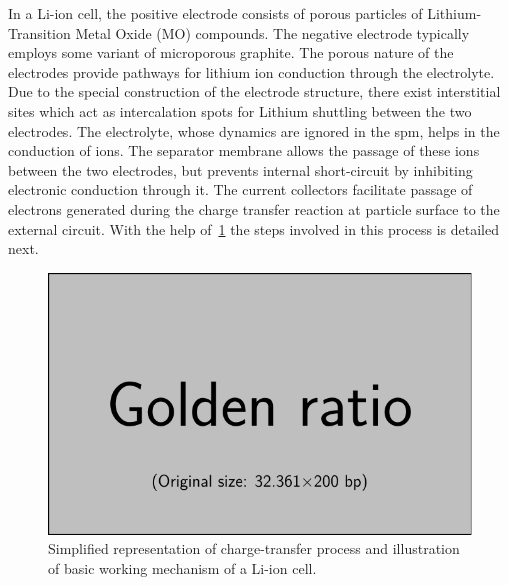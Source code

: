 In  a Li-ion  cell,  the  positive electrode  consists  of  porous particles  of
Lithium-Transition Metal Oxide (MO)  compounds. The negative electrode typically
employs  some  variant  of  microporous  graphite.  The  porous  nature  of  the
electrodes provide pathways for lithium  ion conduction through the electrolyte.
Due  to  the  special  construction  of the  electrode  structure,  there  exist
interstitial  sites  which act  as  intercalation  spots for  Lithium  shuttling
between the two  electrodes. The electrolyte, whose dynamics are  ignored in the
\gls{spm}, helps  in the  conduction of   ions. The  separator membrane
allows  the passage  of  these ions  between the  two  electrodes, but  prevents
internal  short-circuit  by inhibiting  electronic  conduction  through it.  The
current collectors facilitate  passage of electrons generated  during the charge
transfer reaction  at particle surface  to the  external circuit. With  the help
of~\cref{fig:chargetransferprocess}  the  steps  involved  in  this  process  is
detailed next.

\begin{figure}[h]
    \centering
    \includegraphics{placeholder_images/example-image-golden.pdf}
    \caption[Charge-transer and basic working mechanism of a Li-ion cell]{Simplified representation of charge-transfer
    process and illustration of basic working mechanism of a Li-ion cell.}
    \label{fig:chargetransferprocess}
\end{figure}

